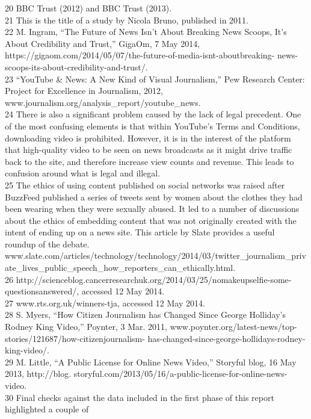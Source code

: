 \begin{enumerate}
20 BBC Trust (2012) and BBC Trust (2013).\\
21 This is the title of a study by Nicola Bruno, published in 2011.\\
22 M. Ingram, ``The Future of News Isn't About Breaking News Scoops, It's About Credibility and
Trust,'' GigaOm, 7 May 2014, https://gigaom.com/2014/05/07/the-future-of-media-isnt-aboutbreaking-
news-scoops-its-about-credibility-and-trust/.\\
23 ``YouTube & News: A New Kind of Visual Journalism,'' Pew Research Center: Project for Excellence
in Journalism, 2012, www.journalism.org/analysis_report/youtube_news.\\
24 There is also a significant problem caused by the lack of legal precedent. One of the most confusing
elements is that within YouTube's Terms and Conditions, downloading video is prohibited.
However, it is in the interest of the platform that high-quality video to be seen on news broadcasts
as it might drive traffic back to the site, and therefore increase view counts and revenue. This leads
to confusion around what is legal and illegal.\\
25 The ethics of using content published on social networks was raised after BuzzFeed published a
series of tweets sent by women about the clothes they had been wearing when they were sexually
abused. It led to a number of discussions about the ethics of embedding content that was not
originally created with the intent of ending up on a news site. This article by Slate provides a
useful roundup of the debate. www.slate.com/articles/technology/technology/2014/03/twitter_journalism_private_lives_public_speech_how_reporters_can_ethically.html.\\
26 http://scienceblog.cancerresearchuk.org/2014/03/25/nomakeupselfie-some-questionsanswered/,
accessed 12 May 2014.\\
27 www.rts.org.uk/winners-tja, accessed 12 May 2014.\\
28 S. Myers, ``How Citizen Journalism has Changed Since George Holliday's Rodney King Video,''
Poynter, 3 Mar. 2011, www.poynter.org/latest-news/top-stories/121687/how-citizenjournalism-
has-changed-since-george-hollidays-rodney-king-video/.\\
29 M. Little, ``A Public License for Online News Video,'' Storyful blog, 16 May 2013, http://blog.
storyful.com/2013/05/16/a-public-license-for-online-news-video.\\
30 Final checks against the data included in the first phase of this report highlighted a couple of

\end{enumerate}
